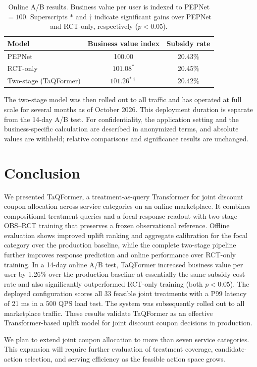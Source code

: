 \documentclass[sigconf,nonacm]{acmart}
\newcommand{\model}{TaQFormer\xspace}
\begin{document}
\begin{table}[t]
  \centering
  \small
  \setlength{\tabcolsep}{5pt}
  \caption{Online A/B results. Business value per user is indexed to PEPNet${}=100$. Superscripts $*$ and $\dagger$ indicate significant gains over PEPNet and RCT-only, respectively ($p<0.05$).}
  \label{tab:online-ab}
  \begin{tabular}{@{}lcc@{}}
    \toprule
    Model & Business value index & Subsidy rate \\
    \midrule
    PEPNet & 100.00 & 20.43\% \\
    RCT-only & $101.08^{*}$ & 20.45\% \\
    Two-stage (\model) & $101.26^{*\dagger}$ & 20.42\% \\
    \bottomrule
  \end{tabular}
\end{table}

The two-stage model was then rolled out to all traffic and has operated at
full scale for several months as of October 2026. This deployment duration
is separate from the 14-day A/B test. For confidentiality, the application
setting and the business-specific calculation are described in anonymized
terms, and absolute values are withheld; relative comparisons and
significance results are unchanged.

\section{Conclusion}
We presented \model, a treatment-as-query Transformer for joint discount coupon allocation across service categories on an online marketplace. It combines compositional treatment queries and a focal-response readout with two-stage OBS–RCT training that preserves a frozen observational reference. Offline evaluation shows improved uplift ranking and aggregate calibration for the focal category over the production baseline, while the complete two-stage pipeline further improves response prediction and online performance over RCT-only training. In a 14-day online A/B test, \model increased business value per user by 1.26\% over the production baseline at essentially the same subsidy cost rate and also significantly outperformed RCT-only training (both $p<0.05$). The deployed configuration scores all 33 feasible joint treatments with a P99 latency of 21 ms in a 500 QPS load test. The system was subsequently rolled out to all marketplace traffic. These results validate \model as an effective Transformer-based uplift model for joint discount coupon decisions in production.

We plan to extend joint coupon allocation to more than seven service categories. This expansion will require further evaluation of treatment coverage, candidate-action selection, and serving efficiency as the feasible action space grows.



\end{document}
